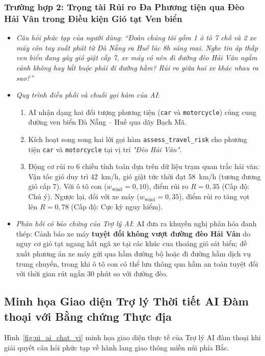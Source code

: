 \subsubsection{Trường hợp 2: Trọng tài Rủi ro Đa Phương tiện qua Đèo Hải Vân trong Điều kiện Gió tạt Ven biển}
\begin{itemize}
    \item \textit{Câu hỏi phức tạp của người dùng}: \textit{``Đoàn chúng tôi gồm 1 ô tô 7 chỗ và 2 xe máy côn tay xuất phát từ Đà Nẵng ra Huế lúc 8h sáng mai. Nghe tin áp thấp ven biển đang gây gió giật cấp 7, xe máy có nên đi đường đèo Hải Vân ngắm cảnh không hay bắt buộc phải đi đường hầm? Rủi ro giữa hai xe khác nhau ra sao?''}
    \item \textit{Quy trình điều phối và chuỗi gọi hàm của AI}:
    \begin{enumerate}
        \item AI nhận dạng hai đối tượng phương tiện (\texttt{car} và \texttt{motorcycle}) cùng cung đường ven biển Đà Nẵng -- Huế qua dãy Bạch Mã.
        \item Kích hoạt song song hai lời gọi hàm \texttt{assess\_travel\_risk} cho phương tiện \texttt{car} và \texttt{motorcycle} tại vị trí \textit{"Đèo Hải Vân"}.
        \item Động cơ rủi ro 6 chiều tính toán dựa trên dữ liệu trạm quan trắc hải văn: Vận tốc gió duy trì 42~km/h, gió giật tức thời đạt 58~km/h (tương đương gió cấp 7). Với ô tô con ($w_{\text{wind}} = 0,10$), điểm rủi ro $R = 0,35$ (Cấp độ: Chú ý). Ngược lại, đối với xe máy ($w_{\text{wind}} = 0,35$), điểm rủi ro tăng vọt lên $R = 0,78$ (Cấp độ: Cực kỳ nguy hiểm).
    \end{enumerate}
    \item \textit{Phản hồi có bảo chứng của Trợ lý AI}: AI đưa ra khuyến nghị phân hóa đanh thép: Cảnh báo xe máy \textbf{tuyệt đối không vượt đường đèo Hải Vân} do nguy cơ gió tạt ngang hất ngã xe tại các khúc cua thoáng gió sát biển; đề xuất phương án xe máy gửi qua hầm đường bộ hoặc đi đường hầm dịch vụ trung chuyển, trong khi ô tô con có thể lưu thông qua hầm an toàn tuyệt đối với thời gian rút ngắn 30 phút so với đường đèo.
\end{itemize}

\subsection{Minh họa Giao diện Trợ lý Thời tiết AI Đàm thoại với Bằng chứng Thực địa}
Hình~\ref{fig:ui_ai_chat_vi} minh họa giao diện thực tế của Trợ lý AI đàm thoại khi giải quyết câu hỏi phức tạp về hành lang giao thông miền núi phía Bắc.

